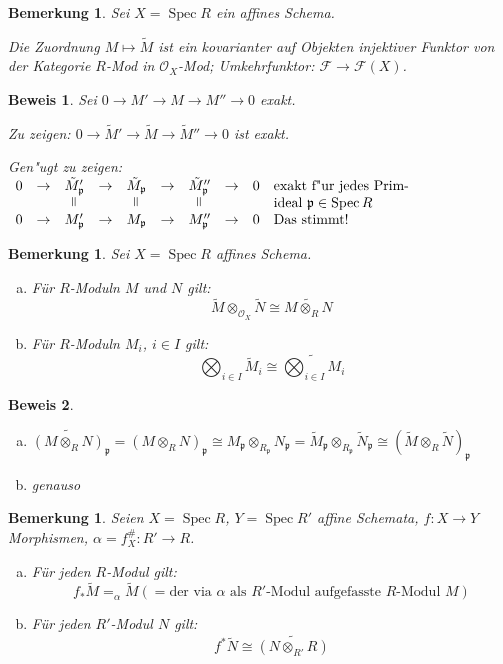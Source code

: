 \documentclass[paper = A4, fontsize=12pt, numbers=noendperiod, chapterprefix=true]{scrbook}
\theoremstyle{break}
\newtheorem{Bem}[Def]{Bemerkung}
\theoremstyle{nonumberbreak}
\newtheorem{bew}{Beweis}
\theoremstyle{nonumberplain}
\newcommand{\verteq}{\rotatebox{90}{$=$}}
\DeclareMathOperator{\Spec}{Spec}
\newcommand{\calF}{\mathcal{F}}
\newcommand{\calO}{\mathcal{O}}
\newcommand{\p}{\mathfrak{p}} %
\begin{document}
\begin{Bem}
Sei $X = \Spec R$ ein affines Schema.

Die Zuordnung $M \mapsto \tilde M$ ist ein kovarianter auf Objekten injektiver Funktor von der Kategorie $R$-Mod in $\calO_X$-Mod; Umkehrfunktor: $\calF \to \calF(X)$.
\end{Bem}

\begin{bew}
Sei $0 \to M' \to M \to M'' \to 0$ exakt.

\emph{Zu zeigen}: $0 \to \tilde M' \to \tilde M \to \tilde M'' \to 0$ ist exakt.

\emph{Gen"ugt zu zeigen}: $\begin{array}{cccccccccl} 0 &\to& \tilde M_\p' &\to& \tilde M_\p &\to& \tilde M_\p'' &\to& 0 & \text{exakt f"ur jedes Prim-}\\
	&&\verteq&&\verteq&&\verteq&&&\text{ideal } \p \in \Spec R \\
	0 &\to& M_\p' &\to& M_\p &\to& M_\p'' &\to& 0 & \text{Das stimmt!}\end{array}$
\end{bew}

\begin{Bem}
Sei $X = \Spec R$ affines Schema.
\begin{enumerate}[a)]
\item
	F\"ur $R$-Moduln $M$ und $N$ gilt:
		\[\tilde M \otimes_{\calO_X} \tilde N \cong \widetilde{M \otimes_R N}\]
\item
	F\"ur $R$-Moduln $M_i$, $i \in I$ gilt:
		\[ \bigotimes_{i\in I} \tilde M_i \cong \widetilde{\bigotimes_{i \in I} M_i} \]
\end{enumerate}\end{Bem}

\begin{bew}\begin{enumerate}[a)]
\item
	$\widetilde{(M \otimes_R N)}_\p = (M \otimes_R N)_\p \cong M_\p \otimes_{R_\p} N_\p = \tilde M_\p \otimes_{R_\p} \tilde N_\p \cong (\tilde M \otimes_R \tilde N)_\p$
\item
	genauso
\end{enumerate}\end{bew}

\begin{Bem}\label{9.7}
Seien $X= \Spec R$, $Y = \Spec R'$ affine Schemata, $f: X \to Y$ Morphismen, $\alpha = f_X^\#: R' \to R$.
\begin{enumerate}[a)]
\item
	F\"ur jeden $R$-Modul gilt:
		\[ f_*\tilde M = _\alpha\tilde M (= \text{der via } \alpha \text{ als } R' \text{-Modul aufgefasste } R \text{-Modul } M) \]
\item\label{9.7b}
	F\"ur jeden $R'$-Modul $N$ gilt:
		\[ f^*\tilde N \cong \widetilde{(N \otimes_{R'} R)} \]
\end{enumerate}\end{Bem}
\end{document}
